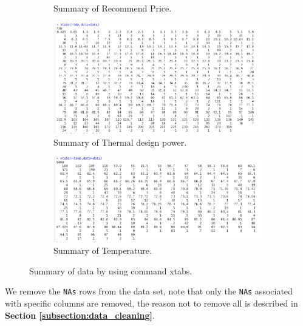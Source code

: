 \begin{figure}[!h]
\begin{subfigure}[b]{0.49\textwidth}
        \caption{Summary of Recommend Price.}
    \end{subfigure}
   \hfill
    \begin{subfigure}[b]{0.49\textwidth}
        \centering
        \includegraphics[width=\linewidth]{graphics/new_graphics/Xtabs/xtabs-tdp.png}
        \caption{Summary of Thermal design power.}
    \end{subfigure}
    \begin{subfigure}[b]{0.49\textwidth}
        \centering
        \includegraphics[width=\linewidth]{graphics/new_graphics/Xtabs/xtabs-temp.png}
        \caption{Summary of Temperature.}
    \end{subfigure}
    \caption{Summary of data by using command xtabs.}
\end{figure}
We remove the \texttt{NAs} rows from the data set, note that only the
\texttt{NAs} associated with specific columns are removed, the reason not to remove all is described in \textbf{Section \ref{subsection:data_cleaning}}.



